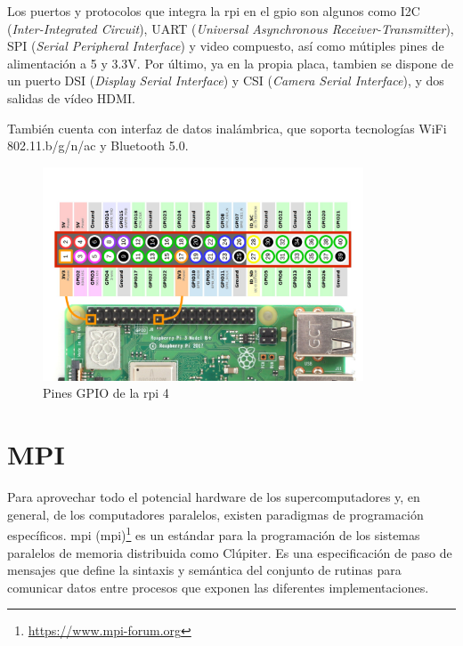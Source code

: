 Los puertos y protocolos que integra la \acrlong{rpi} en el \acrshort{gpio} son algunos como I2C (\textit{Inter-Integrated Circuit}), UART (\textit{Universal Asynchronous Receiver-Transmitter}), SPI (\textit{Serial Peripheral Interface}) y video compuesto, así como mútiples pines de alimentación a 5 y 3.3V. Por último, ya en la propia placa, tambien se dispone de un puerto DSI (\textit{Display Serial Interface}) y CSI (\textit{Camera Serial Interface}), y dos salidas de vídeo HDMI.

También cuenta con interfaz de datos inalámbrica, que soporta tecnologías WiFi 802.11.b/g/n/ac y Bluetooth 5.0.

\begin{figure}[h!]
  \centering
  \includegraphics[width=0.85\textwidth]{img/rpi_parts/rpi_gpio.png}
  \caption{Pines GPIO de la \acrlong{rpi} 4}
  \label{fig:rpi_gpio_pinout}
\end{figure}

\section{MPI}
Para aprovechar todo el potencial hardware de los supercomputadores y, en general, de los computadores paralelos, existen paradigmas de programación específicos. \acrshort{mpi} (\acrlong{mpi})\footnote{\url{https://www.mpi-forum.org}} es un estándar para la programación de los sistemas paralelos de memoria distribuida como Clúpiter. Es una especificación de paso de mensajes que define la sintaxis y semántica del conjunto de rutinas para comunicar datos entre procesos que exponen las diferentes implementaciones. 


